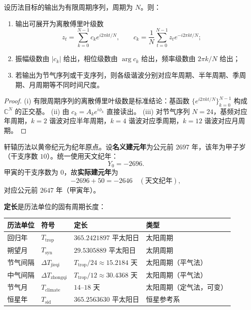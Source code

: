 \begin{theorem}[由历法数据构建周期级数]\label{thm:calendar_series_reconstruction}
设历法目标的输出为有限周期序列，周期为 \(N\)。则：
\begin{enumerate}[label=(\roman*)]
    \item 输出可展开为离散傅里叶级数
    \[
    z_t=\sum_{k=0}^{N-1}c_k e^{i2\pi kt/N},\qquad
    c_k=\frac1N\sum_{t=0}^{N-1}z_t e^{-i2\pi kt/N};
    \]
    \item 振幅级数由 \(|c_k|\) 给出，相位级数由 \(\arg c_k\) 给出，频率级数由 \(2\pi k/N\) 给出；
    \item 若输出为节气序列或干支序列，则各级谐波分别对应年周期、半年周期、季周期、月周期等不同时间尺度。
\end{enumerate}
\end{theorem}

\begin{proof}
(i) 有限周期序列的离散傅里叶级数是标准结论：基函数 \(\{e^{i2\pi kt/N}\}_{k=0}^{N-1}\) 构成 \(\mathbb C^N\) 的正交基。
(ii) 由 \(c_k=A_k e^{i\phi_k}\) 直接读出。
(iii) 对节气序列 \(N=24\)，基频对应年周期，\(k=2\) 谐波对应半年周期，\(k=4\) 谐波对应季周期，\(k=12\) 谐波对应月周期。
\end{proof}

\begin{definition}[轩辕历法的名义建元与实际建元年]\label{def:xuanyuan_epoch}
轩辕历法以黄帝纪元为纪年原点。设\textbf{名义建元年}为公元前 \(2697\) 年，该年为甲子岁（干支序数 \(10\)）。统一使用天文纪年：
\[
Y_0=-2696.
\]
甲寅的干支序数为 \(0\)，故\textbf{实际建元年}为
\[
-2696+50=-2646\quad(\text{天文纪年}),
\]
对应公元前 \(2647\) 年（甲寅年）。
\end{definition}

\begin{definition}[定长：历法单位的固有周期]\label{def:fixed_length}
\textbf{定长}是历法单位的固有周期长度：
\begin{center}
\begin{tabular}{>{\centering\arraybackslash}p{2.5cm}>{\centering\arraybackslash}p{2.5cm}>{\centering\arraybackslash}p{2.5cm}>{\centering\arraybackslash}p{3cm}}
\toprule
历法单位 & 符号 & 定长 & 类型 \\
\midrule
回归年 & \(T_{\text{trop}}\) & \(365.2421897\) 平太阳日 & 太阳周期 \\
朔望月 & \(T_{\text{syn}}\) & \(29.5305889\) 平太阳日 & 太阴周期 \\
节气间隔 & \(\Delta T_{\text{jieqi}}\) & \(T_{\text{trop}}/24\approx 15.2184\) 天 & 太阳周期（平气法） \\
中气间隔 & \(\Delta T_{\text{zhongqi}}\) & \(T_{\text{trop}}/12\approx 30.4368\) 天 & 太阳周期（平气法） \\
节气月 & \(T_{\text{climate}}\) & \(14\)--\(18\) 天 & 太阳周期（定气法，可变） \\
恒星年 & \(T_{\text{sid}}\) & \(365.2563630\) 平太阳日 & 恒星参考系 \\
\bottomrule
\end{tabular}
\end{center}
\end{definition}

